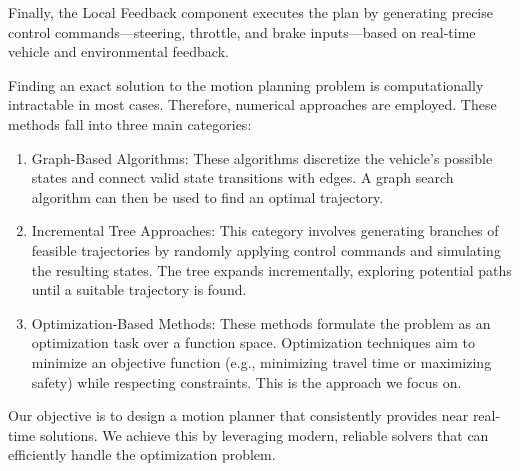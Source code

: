 Finally, the Local Feedback component executes the plan by generating precise control commands—steering, throttle, and brake inputs—based on
real-time vehicle and environmental feedback.

Finding an exact solution to the motion planning problem is computationally intractable in most cases.
Therefore, numerical approaches are employed.
These methods fall into three main categories:

\begin{enumerate}
	\item Graph-Based Algorithms: These algorithms discretize the vehicle's possible states
	      and connect valid state transitions with edges.
	      A graph search algorithm can then be used to find an optimal trajectory.

	\item Incremental Tree Approaches: This category involves generating branches of feasible trajectories by randomly applying control commands and simulating
	      the resulting states.
	      The tree expands incrementally, exploring potential paths until a suitable trajectory is found.

	\item Optimization-Based Methods: These methods formulate the problem as an optimization task over a function space.
	      Optimization techniques aim to minimize an objective function (e.g., minimizing travel time or maximizing safety) while respecting constraints.
	      This is the approach we focus on.
\end{enumerate}

Our objective is to design a motion planner that consistently provides near real-time solutions.
We achieve this by leveraging modern, reliable solvers that can efficiently handle the optimization problem.
